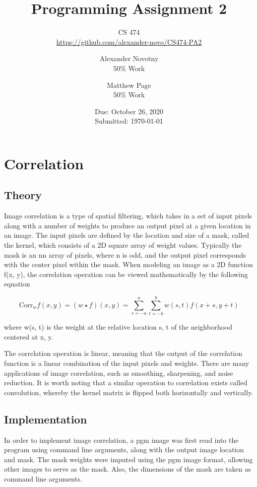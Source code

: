 \documentclass[headings=optiontoheadandtoc,listof=totoc,parskip=full]{scrartcl}
\title{Programming Assignment 2}
\subtitle{CS 474\\\url{https://github.com/alexander-novo/CS474-PA2}}
\author{Alexander Novotny\\50\% Work\\\Cref{sec:unsharp,sec:gradient} \and Matthew Page\\50\% Work\\\Cref{sec:correlation,sec:smoothing,sec:median}}
\date{Due: October 26, 2020 \\ Submitted: \today}
\begin{document}
\maketitle
\tableofcontents
{}

\newpage
{}

\section{Correlation}
\label{sec:correlation}

\subsection{Theory}

Image correlation is a type of spatial filtering, which takes in a set of input pixels along with a number of weights to produce an output pixel at a given location in an image. The input pixels are defined by the location and size of a mask, called the kernel, which consists of a 2D square array of weight values. Typically the mask is an nn array of pixels, where n is odd, and the output pixel corresponds with the center pixel within the mask. When modeling an image as a 2D function f(x, y), the correlation operation can be viewed mathematically by the following equation

\[\text{Corr}_w f(x, y) = (w \star f)(x, y) = \sum_{s=-a}^a \sum_{t=-b}^b w(s, t) f(x+s, y+t)\]

where w(s, t) is the weight at the relative location s, t of the neighborhood centered at x, y.

The correlation operation is linear, meaning that the output of the correlation function is a linear combination of the input pixels and weights. There are many applications of image correlation, such as smoothing, sharpening, and noise reduction. It is worth noting that a similar operation to correlation exists called convolution, whereby the kernel matrix is flipped both horizontally and vertically. 


\subsection{Implementation}

In order to implement image correlation, a pgm image was first read into the program using command line arguments, along with the output image location and mask. The mask weights were imputed using the pgm image format, allowing other images to serve as the mask. Also, the dimensions of the mask are taken as command line arguments. 
\end{document}
